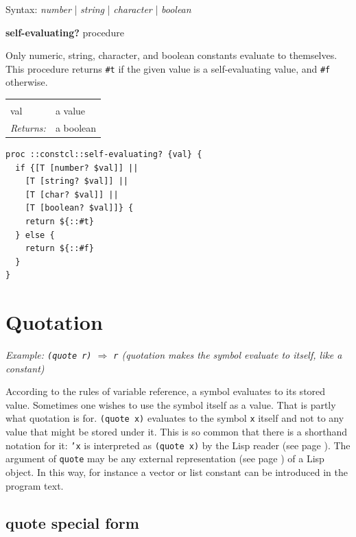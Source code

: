 \documentclass[twoside]{report}
\begin{document}
Syntax: \emph{number} | \emph{string} | \emph{character} | \emph{boolean}

\textbf{self-evaluating?} procedure

Only numeric, string, character, and boolean constants evaluate to themselves. This procedure returns \texttt{\#t} if the given value is a self-evaluating value, and \texttt{\#f} otherwise.

\noindent\begin{tabular}{ |p{1.9cm} p{8cm}| }
\hline
\rowcolor[HTML]{CCCCCC} \multicolumn{2}{|l|}{\bf self-evaluating? (internal)} \\
val & a value \\
\textit{Returns:} & a boolean \\
\hline
\end{tabular}

\begin{lstlisting}
proc ::constcl::self-evaluating? {val} {
  if {[T [number? $val]] ||
    [T [string? $val]] ||
    [T [char? $val]] ||
    [T [boolean? $val]]} {
    return ${::#t}
  } else {
    return ${::#f}
  }
}
\end{lstlisting}

\section{Quotation}
\label{quotation}

\emph{Example: \texttt{(quote r)} $\Rightarrow$ \texttt{r} (quotation makes the symbol evaluate to itself, like a constant)}

According to the rules of variable reference, a symbol evaluates to its stored value. Sometimes one wishes to use the symbol itself as a value. That is partly what quotation is for. \texttt{(quote x)} evaluates to the symbol \texttt{x} itself and not to any value that might be stored under it. This is so common that there is a shorthand notation for it: \texttt{'x} is interpreted as \texttt{(quote x)} by the Lisp reader (see page \pageref{reader-procedures}). The argument of \texttt{quote} may be any external representation (see page \pageref{external-representation}) of a Lisp object. In this way, for instance a vector or list constant can be introduced in the program text.

\subsection{quote special form}
\label{quote-special-form}
\end{document}
